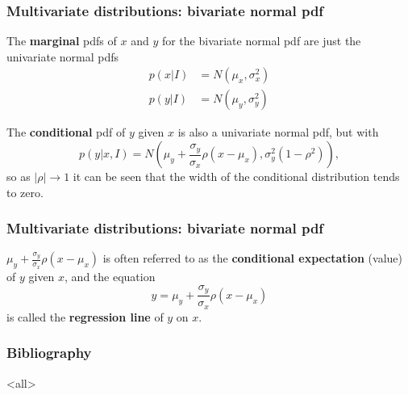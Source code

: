 \begin{frame}

\frametitle{Multivariate distributions: bivariate normal pdf}
\label{multivariatedistributions:bivariatenormalpdf}

The \textbf{marginal} pdfs of $x$ and $y$ for the bivariate normal pdf are just the univariate
normal pdfs
\begin{align*}
    p(x|I) &= N(\mu_x,\sigma_x^2) \\
    p(y|I) &= N(\mu_y, \sigma_y^2)
\end{align*}

The \textbf{conditional} pdf of $y$ given $x$ is also a univariate normal pdf, but with
\[
p(y|x,I) = N\left(\mu_y + \frac{\sigma_y}{\sigma_x}\rho(x-\mu_x), \sigma_y^2(1-\rho^2)\right),
\]
so as $|\rho| \rightarrow 1$ it can be seen that the width of the conditional distribution tends
to zero.

\end{frame}

\begin{frame}

\frametitle{Multivariate distributions: bivariate normal pdf}
\label{multivariatedistributions:bivariatenormalpdf}

$\mu_y + \frac{\sigma_y}{\sigma_x}\rho(x-\mu_x)$ is often referred to as the \textbf{conditional
expectation} (value) of $y$ given $x$, and the equation
\[
y = \mu_y + \frac{\sigma_y}{\sigma_x}\rho(x-\mu_x)
\]
is called the \textbf{regression line} of $y$ on $x$.


\end{frame}

\begin{frame}

\frametitle{Bibliography}
\label{bibliography}






\end{frame}

\mode<all>


\mode*

